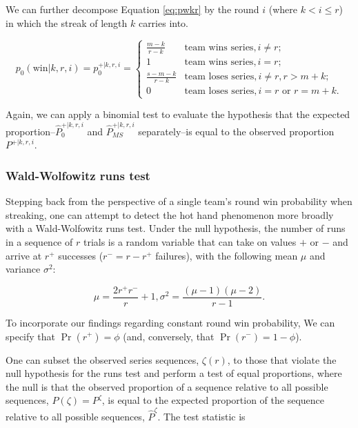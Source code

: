 \documentclass{article}
\begin{document}
We can further decompose Equation \ref{eq:pwkr} by the round \(i\)
(where \(k < i \leq r\)) in which the streak of length \(k\) carries
into.

\begin{equation}\label{eq:pwkri}
p_0(\text{win} | k, r, i) = p^{+|k,r,i}_0 = \begin{cases}
  \frac{m - k}{r - k} & \text{team wins series}, i \neq r; \\
  1 & \text{team wins series}, i = r; \\
  \frac{s - m - k}{r - k} & \text{team loses series}, i \neq r, r > m + k; \\
  0 & \text{team loses series}, i = r \text{ or } r = m + k.
\end{cases}
\end{equation}

Again, we can apply a binomial test to evaluate the hypothesis that the
expected proportion--\(\hat{P}^{+|k,r,i}_0\) and
\(\hat{P}^{+|k,r,i}_{MS}\) separately--is equal to the observed
proportion \(P^{+|k,r,i}\).

\hypertarget{wald-wolfowitz-runs-test}{%
\subsubsection{Wald-Wolfowitz runs
test}\label{wald-wolfowitz-runs-test}}

Stepping back from the perspective of a single team's round win
probability when streaking, one can attempt to detect the hot hand
phenomenon more broadly with a Wald-Wolfowitz runs test. Under the null
hypothesis, the number of runs in a sequence of \(r\) trials is a random
variable that can take on values \(+\) or \(-\) and arrive at \(r^+\)
successes (\(r^- = r - r^+\) failures), with the following mean \(\mu\)
and variance \(\sigma^2\):

\begin{equation}\label{eq:ww}
\mu = \frac{2r^{+}r^{-}}{r} + 1, \sigma^2 = \frac{(\mu-1)(\mu-2)}{r-1}.
\end{equation}

To incorporate our findings regarding constant round win probability, We
can specify that \(\Pr(r^+) = \phi\) (and, conversely, that
\(\Pr(r^-) = 1 - \phi\)).

One can subset the observed series sequences, \(\zeta(r)\), to those
that violate the null hypothesis for the runs test and perform a test of
equal proportions, where the null is that the observed proportion of a
sequence relative to all possible sequences, \(P(\zeta) = P^\zeta\), is
equal to the expected proportion of the sequence relative to all
possible sequences, \(\hat{P}^\zeta\). The test statistic is
\end{document}
